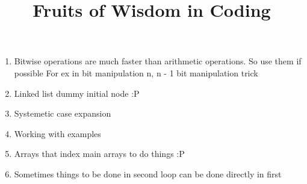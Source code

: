 \documentclass[12pt]{article}
\title{Fruits of Wisdom in Coding}
\author{}
\date{}
\begin{document}
\maketitle

\begin{enumerate}
  \item Bitwise operations are much faster than arithmetic operations. So use them if possible
    For ex in bit manipulation n, n - 1 bit manipulation trick
  \item Linked list dummy initial node :P
  \item Systemetic case expansion
  \item Working with examples
  \item Arrays that index main arrays to do things :P
  \item Sometimes things to be done in second loop can be done directly in first

\end{enumerate}
\end{document}
